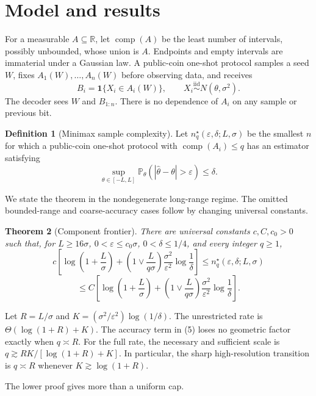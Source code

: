\documentclass{article}
\newtheorem{theorem}{Theorem}
\theoremstyle{definition}
\newtheorem{definition}[theorem]{Definition}
\theoremstyle{remark}
\newcommand{\Prb}{\mathbb P}
\newcommand{\R}{\mathbb R}
\newcommand{\1}{\mathbf 1}
\begin{document}
\section{Model and results}

For a measurable \(A\subseteq\R\), let \(\operatorname{comp}(A)\) be the least number of intervals, possibly unbounded, whose union is \(A\). Endpoints and empty intervals are immaterial under a Gaussian law. A public-coin one-shot protocol samples a seed \(W\), fixes \(A_1(W),\ldots,A_n(W)\) before observing data, and receives \[ B_i=\1\{X_i\in A_i(W)\},\qquad X_i\stackrel{\mathrm{iid}}{\sim}N(\theta,\sigma^2). \] The decoder sees \(W\) and \(B_{1:n}\). There is no dependence of \(A_i\) on any sample or previous bit.

\begin{definition}[Minimax sample complexity]
Let \(n_q^\star(\varepsilon,\delta;L,\sigma)\) be the smallest \(n\) for which a public-coin one-shot protocol with \(\operatorname{comp}(A_i)\leq q\) has an estimator satisfying \[ \sup_{\theta\in[-L,L]}\Prb_\theta(|\widehat\theta-\theta|>\varepsilon)\leq\delta. \]
\end{definition}

We state the theorem in the nondegenerate long-range regime. The omitted bounded-range and coarse-accuracy cases follow by changing universal constants.

\begin{theorem}[Component frontier]\label{thm:main}
There are universal constants \(c,C,c_0>0\) such that, for \(L\geq16\sigma\), \(0<\varepsilon\leq c_0\sigma\), \(0<\delta\leq1/4\), and every integer \(q\geq1\), \[ c\left[ \log\!\left(1+\frac L\sigma\right) + \left(1\vee\frac{L}{q\sigma}\right) \frac{\sigma^2}{\varepsilon^2}\log\frac1\delta \right] \leq n_q^\star(\varepsilon,\delta;L,\sigma) \] \[ \leq C\left[ \log\!\left(1+\frac L\sigma\right) + \left(1\vee\frac{L}{q\sigma}\right) \frac{\sigma^2}{\varepsilon^2}\log\frac1\delta \right]. \tag{5} \]
\end{theorem}

Let \(R=L/\sigma\) and \(K=(\sigma^2/\varepsilon^2)\log(1/\delta)\). The unrestricted rate is \(\Theta(\log(1+R)+K)\). The accuracy term in (5) loses no geometric factor exactly when \(q\asymp R\). For the full rate, the necessary and sufficient scale is \(q\gtrsim RK/[\log(1+R)+K]\). In particular, the sharp high-resolution transition is \(q\asymp R\) whenever \(K\gtrsim\log(1+R)\).

The lower proof gives more than a uniform cap.
\end{document}
